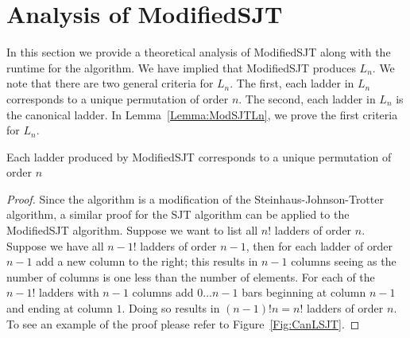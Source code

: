 \section{Analysis of {\sc ModifiedSJT}}
In this section we provide a theoretical analysis of {\sc ModifiedSJT} along with the runtime for the algorithm. 
We have implied that {\sc ModifiedSJT} produces $L_{n}$. 
We note that there are two general criteria for $L_{n}$. The first, each ladder in $L_{n}$ corresponds to a 
unique permutation of order $n$. The second, each ladder in $L_{n}$ is the canonical ladder. In Lemma~\ref{Lemma:ModSJTLn}, 
we prove the first criteria for $L_{n}$. 
\begin{lemma}
  Each ladder produced by {\sc ModifiedSJT} corresponds to a unique permutation of order $n$
  \label{Lemma:ModSJTLn}
\end{lemma}
\begin{proof}
  Since the algorithm is a modification of the Steinhaus-Johnson-Trotter algorithm, a similar proof for the SJT algorithm 
can be applied to the {\sc ModifiedSJT} algorithm. Suppose we want to list all $n!$ ladders 
of order $n$. Suppose we have all $n-1!$ ladders of order $n-1$, then for 
each ladder of order $n-1$ add a new column to the right; this results in $n-1$ columns seeing as 
the number of columns is one less than the number of elements. For each of the $n-1!$ ladders with $n-1$ columns 
add $0 \dots n-1$ bars beginning at column $n-1$ and ending 
at column $1$. Doing so results in $(n-1)!n=n!$ ladders of order $n$. To see 
an example of the proof please refer to Figure~\ref{Fig:CanLSJT}.
\end{proof}


